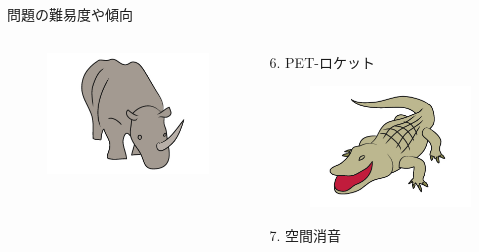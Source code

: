 \documentclass[dvipdfmx]{beamer}
\newenvironment{wideitemize}{\itemize\setlength{\itemsep}{1em}}{\enditemize}
\begin{document}
\begin{frame}{問題の難易度や傾向}
\begin{columns}[t]
\begin{column}{0.5\textwidth}
\begin{wideitemize}
\begin{figure}[htbp]
    \includegraphics[bb=0 0 6.4 4.8, scale=0.08]{img/a05.jpg}
\end{figure}
\end{wideitemize}
\end{column}
\begin{column}{0.5\textwidth}
\begin{wideitemize}
\item[6.] PET-ロケット
\begin{figure}[htbp]
    \centering
    \includegraphics[bb=0 0 6.4 4.8, scale=0.07]{img/a06.jpg}
\end{figure}
\item[7.] 空間消音
\begin{figure}[htbp]
    \centering

\end{figure}
\end{wideitemize}
\end{column}
\end{columns}
\end{frame}
\end{document}

